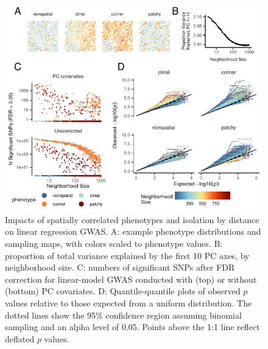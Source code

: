 \documentclass[10pt,twoside,lineno]{gsajnl}
\begin{document}
\afterpage{\clearpage}
\begin{figure}[p]
\centering
\includegraphics[width=\textwidth]{figures/gwas_summary_nsig_qqplots_loglog.pdf}
\caption{Impacts of spatially correlated phenotypes and isolation by distance on linear regression GWAS.  A: example phenotype distributions and sampling maps, with colors scaled to phenotype values. B: proportion of total variance explained by the first 10 PC axes, by neighborhood size. C: numbers of significant SNPs after FDR correction for linear-model GWAS conducted with (top) or without (bottom) PC covariates. D: Quantile-quantile plots of observed $p$ values relative to those expected from a uniform distribution. The dotted lines show the 95\% confidence region assuming binomial sampling and an alpha level of 0.05. Points above the 1:1 line reflect deflated $p$ values.}
\label{fig:gwas}
\end{figure}
\end{document}
